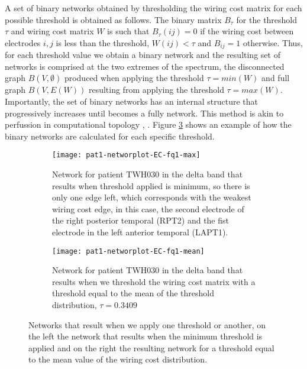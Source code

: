 \documentclass[11pt, onecolumn]{article}
\begin{document}
A set of binary networks obtained by thresholding the wiring cost matrix for each possible threshold is obtained as follows. The binary matrix $B_{\tau}$ for the threshold $\tau$ and wiring cost matrix $W$ is such that $B_{\tau}(ij) =0$ if the wiring cost between electrodes $i,j$ is less than the threshold, $W(ij) < \tau$ and $B_{ij}=1$ otherwise. 
Thus, for each threshold value we obtain a binary network and the resulting set of networks is comprised at the two extremes of the spectrum, the disconnected graph $B(V,\emptyset)$ produced when applying the threshold $\tau = min(W)$ and full graph $B(V,E(W))$ resulting from applying the threshold $\tau = max(W)$. 
Importantly, the set of binary networks has an internal structure that progressively increases until becomes a fully network. This method is akin to perfussion in computational topology \citep{dabaghian2014reconceiving}, \citep{dotko2016topological}. 
Figure \ref{fig:binaryplotnetwork} shows an example of how the binary networks are calculated for each specific threshold.

\begin{figure}[ht] 
  \begin{subfigure}[t]{0.5\linewidth}
    \centering
    \texttt{[image: pat1-networplot-EC-fq1-max]} 
    \caption{Network for patient TWH030 in the delta band that results when  threshold applied is minimum, so there is only one edge left, which corresponds with the weakest wiring cost edge, in this case, the second electrode of the right posterior temporal (RPT2) and the fist electrode in the left anterior temporal (LAPT1).} 
    \label{binaryplotnetwork:a} 
    \vspace{4ex}
  \end{subfigure}%
  \hspace{1ex}
  \begin{subfigure}[t]{0.5\linewidth}
    \centering
    \texttt{[image: pat1-networplot-EC-fq1-mean]} 
    \caption{Network for patient TWH030 in the delta band that results when we threshold the wiring cost matrix with a threshold equal to the mean of the threshold distribution, $\tau =  0.3409$}
    \label{binaryplotnetwork:b} 
    \vspace{4ex}
  \end{subfigure} 
  \caption{Networks that result when we apply one threshold or another, on the left the network that results when the minimum threshold is applied
and on the right the resulting network for a threshold equal to the  mean value of the wiring cost distribution.}
  \label{fig:binaryplotnetwork} 
\end{figure}
\end{document}

